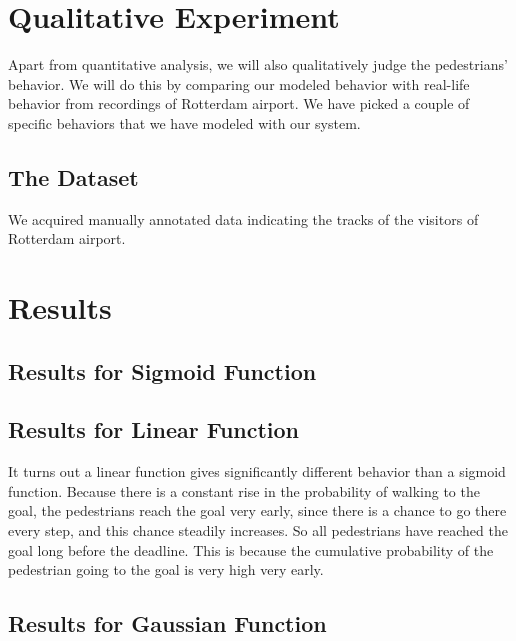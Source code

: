 \documentclass[11pt]{book}
\begin{document}
\section{Qualitative Experiment}
Apart from quantitative analysis, we will also qualitatively judge the pedestrians' behavior. We will do this by comparing our modeled behavior with real-life behavior from recordings of Rotterdam airport. We have picked a couple of specific behaviors that we have modeled with our system.

\subsection{The Dataset}
We acquired manually annotated data indicating the tracks of the visitors of Rotterdam airport. 






\section{Results}

\subsection{Results for Sigmoid Function}


\subsection{Results for Linear Function}
It turns out a linear function gives significantly different behavior than a sigmoid function. Because there is a constant rise in the probability of walking to the goal, the pedestrians reach the goal very early, since there is a chance to go there every step, and this chance steadily increases. So all pedestrians have reached the goal long before the deadline. This is because the cumulative probability of the pedestrian going to the goal is very high very early.

\subsection{Results for Gaussian Function}
\end{document}

